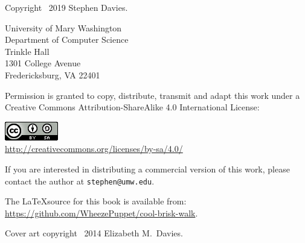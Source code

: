 
\thispagestyle{empty}

Copyright \textcopyright \ 2019 Stephen Davies.

\bigskip

University of Mary Washington\\
Department of Computer Science\\
Trinkle Hall\\
1301 College Avenue\\
Fredericksburg, VA  22401

\vspace{.4in}

Permission is granted to copy, distribute, transmit and adapt this work under a
Creative Commons Attribution-ShareAlike 4.0 International License:

\begin{center}
\includegraphics{cc_license.png}\\
\smallskip
\url{http://creativecommons.org/licenses/by-sa/4.0/}
\end{center}

\vspace{.2in}
If you are interested in distributing a commercial version of this work, please
contact the author at \texttt{stephen@umw.edu}.

\vspace{.4in}
The \LaTeX source for this book is available from:
\url{https://github.com/WheezePuppet/cool-brisk-walk}.

\vspace{1.8in}
Cover art copyright \textcopyright \ 2014 Elizabeth M.~Davies.

